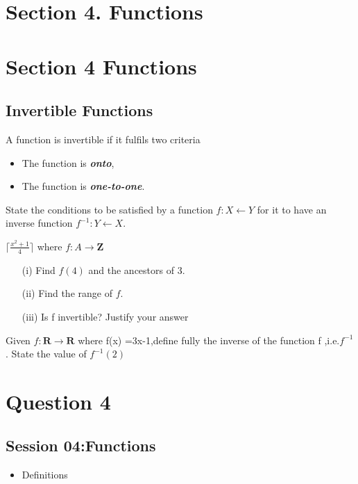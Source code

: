 \documentclass[]{report}
\begin{document}
\newpage

\section*{Section 4. Functions}





\section{Section 4 Functions}

\subsection{Invertible Functions}
A function is invertible if it fulfils two criteria
\begin{itemize}
\item The function is \textbf{\textit{onto}},
\item The function is \textbf{\textit{one-to-one}}.
\end{itemize}

State the conditions to be satisfied by a function
$f : X \leftarrow Y$ for it to have an inverse function
$f^{-1} : Y \leftarrow X$.

$\lceil \frac{x^2+1}{4} \rceil$
where $f : A \rightarrow \textbf{Z}$
\begin{itemize}
\item[(i)] Find $f(4)$ and the ancestors of 3.
\item[(ii)] Find the range of $f$.
\item[(iii)] Is f invertible? Justify your answer
\end{itemize}

Given $f : \textbf{R} \rightarrow \textbf{R}$ where f(x) =3x-1,define fully
the inverse of the function f ,i.e.$f^{-1}$. 
State the value of $f^{-1}(2)$
\section*{Question 4}



\subsection*{Session 04:Functions}
\begin{itemize}
\item Definitions
\end{itemize}
\end{document}
